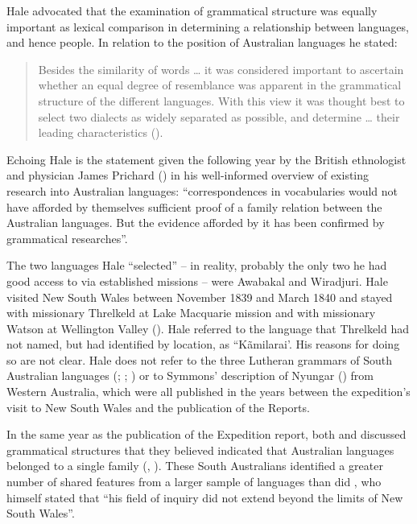Hale advocated that the examination of grammatical structure was equally important as lexical comparison in determining a relationship between languages, and hence people. In relation to the position of Australian languages he stated:
\begin{quote}
Besides the similarity of words … it was considered important to ascertain whether an equal degree of resemblance was apparent in the grammatical structure of the different languages. With this view it was thought best to select two dialects as widely separated as possible, and determine … their leading characteristics (\citeyear[481]{hale_languages_1846}).
\end{quote}

Echoing Hale is the statement given the following year by the British ethnologist and physician James Prichard (\citealt[272]{jamesprichard_1847}) in his well-informed overview of existing research into Australian languages: “correspondences in vocabularies would not have afforded by themselves sufficient proof of a family relation between the Australian languages. But the evidence afforded by it has been confirmed by grammatical researches”.
    
The two languages Hale “selected” – in reality, probably the only two he had good access to via established missions – were Awabakal and Wiradjuri. Hale visited New South Wales between November 1839 and March 1840 and stayed with missionary Threlkeld at Lake Macquarie mission and with missionary Watson at Wellington Valley (\citealt{Wilkes_1845}). Hale referred to the language that Threlkeld had not named, but had identified by location, as “Kãmilarai’. His reasons for doing so are not clear. Hale does not refer to the three Lutheran grammars of South Australian languages (\citealt{teichelmann_outlines_1840}; \citealt{meyer_vocabulary_1843}; \citealt{schurmann_vocabulary_1844}) or to Symmons' description of Nyungar (\citeyear{symmons_grammatical_1841}) from Western Australia, which were all published in the years between the expedition’s visit to New South Wales and the publication of the Reports.

In the same year as the publication of the Expedition report, both \citet[249]{schurmann_aboriginal_1846} and \citet[vi]{moorhouse_vocabulary_1846} discussed grammatical structures that they believed indicated that Australian languages belonged to a single family (, ). These South Australians identified a greater number of shared features from a larger sample of languages than did \citet[479]{hale_languages_1846}, who himself stated that “his field of inquiry did not extend beyond the limits of New South Wales”.

